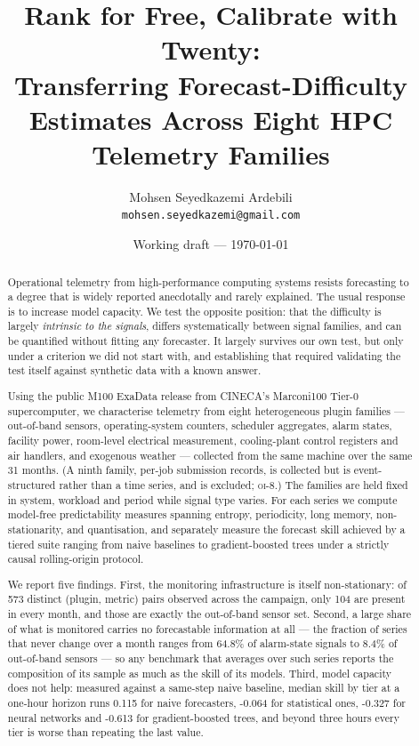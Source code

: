 \documentclass[11pt,a4paper]{article}
\title{Rank for Free, Calibrate with Twenty:\\
       \large Transferring Forecast-Difficulty Estimates Across
       Eight HPC Telemetry Families}
\author{Mohsen Seyedkazemi Ardebili\\
        \small \texttt{mohsen.seyedkazemi@gmail.com}}
\date{Working draft --- \today}
\newcommand{\num}[1]{#1}
\newcommand{\oi}[1]{\textsc{oi-#1}}
\begin{document}
\maketitle

\begin{abstract}
Operational telemetry from high-performance computing systems resists
forecasting to a degree that is widely reported anecdotally and rarely
explained. The usual response is to increase model capacity. We test the
opposite position: that the difficulty is largely \emph{intrinsic to the
signals}, differs systematically between signal families, and can be quantified
without fitting any forecaster. It largely survives our own test, but only under
a criterion we did not start with, and establishing that required validating the
test itself against synthetic data with a known answer.

Using the public M100 ExaData release from CINECA's Marconi100 Tier-0
supercomputer, we characterise telemetry from eight heterogeneous plugin
families --- out-of-band sensors, operating-system counters, scheduler
aggregates, alarm states, facility power, room-level electrical measurement,
cooling-plant control registers and air handlers, and exogenous weather ---
collected from the same machine over the same 31 months. (A ninth family,
per-job submission records, is collected but is event-structured rather than a
time series, and is excluded; \oi{8}.) The families are held
fixed in system, workload and period while signal type varies.
For each series we compute model-free predictability measures spanning entropy,
periodicity, long memory, non-stationarity, and quantisation, and separately
measure the forecast skill achieved by a tiered suite ranging from naive
baselines to gradient-boosted trees under a strictly causal rolling-origin
protocol.

We report five findings. First, the monitoring infrastructure is itself
non-stationary: of \num{573} distinct (plugin, metric) pairs observed across the
campaign, only \num{104} are present in every month, and those are exactly the
out-of-band sensor set. Second, a large share of what is monitored carries no
forecastable information at all --- the fraction of series that never change
over a month ranges from \num{64.8}\% of alarm-state signals to \num{8.4}\% of
out-of-band sensors --- so any benchmark that averages over such series reports
the composition of its sample as much as the skill of its models. Third, model
capacity does not help: measured against a same-step naive baseline, median
skill by tier at a one-hour horizon runs \num{0.115} for naive forecasters,
\num{-0.064} for statistical ones, \num{-0.327} for neural networks and
\num{-0.613} for gradient-boosted trees, and beyond three hours every tier is
worse than repeating the last value.


\end{abstract}
\end{document}
